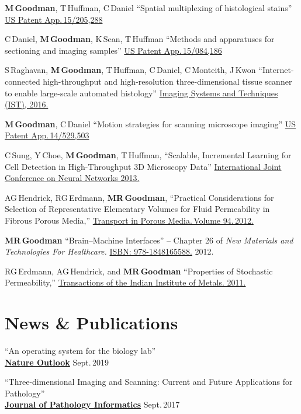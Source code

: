 \documentclass{res}
\begin{document}
\begin{resume}
  \textbf{M\,Goodman}, T\,Huffman, C\,Daniel
  ``Spatial multiplexing of histological stains''
  \href{https://patents.google.com/patent/US20170011511A1/en}{US Patent App.\,15/205,288}

  C\,Daniel, \textbf{M\,Goodman}, K\,Sean, T\,Huffman
  ``Methods and apparatuses for sectioning and imaging samples''
  \href{https://patents.google.com/patent/US20160290895A1/en}{US Patent App.\,15/084,186}

  S\,Raghavan, \textbf{M\,Goodman}, T\,Huffman, C\,Daniel, C\,Monteith, J\,Kwon
  ``Internet-connected high-throughput and high-resolution three-dimensional tissue scanner to
  enable large-scale automated histology''
  \href{https://doi.org/10.1109/IST.2016.7738254}{Imaging Systems and Techniques (IST), 2016.}

  \textbf{M\,Goodman}, C\,Daniel
  ``Motion strategies for scanning microscope imaging''
  \href{https://patents.google.com/patent/US20150138532A1/en}{US Patent App.\,14/529,503}

  C\,Sung, Y\,Choe, \textbf{M\,Goodman}, T\,Huffman,
  ``Scalable, Incremental Learning for Cell Detection in High-Throughput 3D Microscopy Data''
  \href{https://doi.org/10.1109/IJCNN.2013.6706769}{International Joint Conference on Neural Networks 2013.}

  AG\,Hendrick, RG\,Erdmann, \textbf{MR\,Goodman},
  ``Practical Considerations for Selection of Representative
  Elementary Volumes for Fluid Permeability in Fibrous Porous Media,''
  \href{http://dx.doi.org/10.1007/s11242-012-0051-8}{Transport in Porous Media.\,Volume 94.\,2012.}

  \textbf{MR\,Goodman}
  ``Brain--Machine Interfaces'' -- Chapter 26 of \textit{New Materials and Technologies For Healthcare.}
  \href{http://amzn.com/1848165587}{ISBN: 978-1848165588.} 2012.

  RG\,Erdmann, AG\,Hendrick, and \textbf{MR\,Goodman}
  ``Properties of Stochastic Permeability,''
  \href{http://dx.doi.org/10.1007/s12666-009-0038-5}{Transactions of the Indian Institute of Metals. 2011.}

\section{News \& Publications}
  ``An operating system for the biology lab'' \\
  \href{https://www.nature.com/articles/d41586-019-02875-z}{\textbf{Nature Outlook}} \hfill Sept.\,2019

  ``Three-dimensional Imaging and Scanning: Current and Future Applications for Pathology'' \\
  \href{https://www.ncbi.nlm.nih.gov/pmc/articles/PMC5609355/}{\textbf{Journal of Pathology Informatics}} \hfill Sept.\,2017
  

\end{resume}
\end{document}
